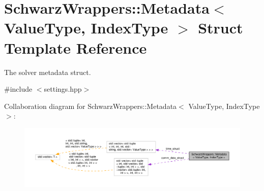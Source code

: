 \hypertarget{structSchwarzWrappers_1_1Metadata}{}\section{Schwarz\+Wrappers\+:\+:Metadata$<$ Value\+Type, Index\+Type $>$ Struct Template Reference}
\label{structSchwarzWrappers_1_1Metadata}


The solver metadata struct.  




{\ttfamily \#include $<$settings.\+hpp$>$}



Collaboration diagram for Schwarz\+Wrappers\+:\+:Metadata$<$ Value\+Type, Index\+Type $>$\+:
\nopagebreak
\begin{figure}[H]
\begin{center}
\leavevmode
\includegraphics[width=350pt]{structSchwarzWrappers_1_1Metadata__coll__graph}
\end{center}
\end{figure}
